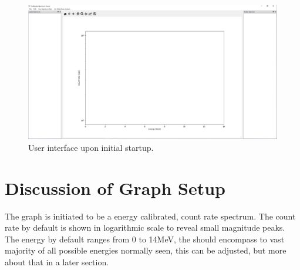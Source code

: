 \begin{figure}[h!]
	\centering
	\includegraphics[width=\linewidth]{Front_Panel.png}
	\caption{User interface upon initial startup.}
	\label{fig:opening}
\end{figure}

\section{Discussion of Graph Setup}
The graph is initiated to be a energy calibrated, count rate spectrum. The count rate by default is shown in logarithmic scale to reveal small magnitude peaks. The energy by default ranges from 0 to 14MeV, the should encompass to vast majority of all possible energies normally seen, this can be adjusted, but more about that in a later section. 


